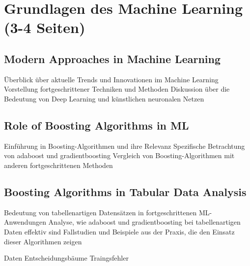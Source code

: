 \section{Grundlagen des Machine Learning (3-4 Seiten)}
\subsection{Modern Approaches in Machine Learning}
Überblick über aktuelle Trends und Innovationen im Machine Learning
Vorstellung fortgeschrittener Techniken und Methoden
Diskussion über die Bedeutung von Deep Learning und künstlichen neuronalen Netzen
\subsection{Role of Boosting Algorithms in ML}
Einführung in Boosting-Algorithmen und ihre Relevanz
Spezifische Betrachtung von \gls{adaboost} und \gls{gradientboosting}
Vergleich von Boosting-Algorithmen mit anderen fortgeschrittenen Methoden
\subsection{Boosting Algorithms in Tabular Data Analysis}
Bedeutung von tabellenartigen Datensätzen in fortgeschrittenen ML-Anwendungen
Analyse, wie \gls{adaboost} und \gls{gradientboosting} bei tabellenartigen Daten effektiv sind
Fallstudien und Beispiele aus der Praxis, die den Einsatz dieser Algorithmen zeigen

Daten
Entscheidungsbäume
Traingsfehler